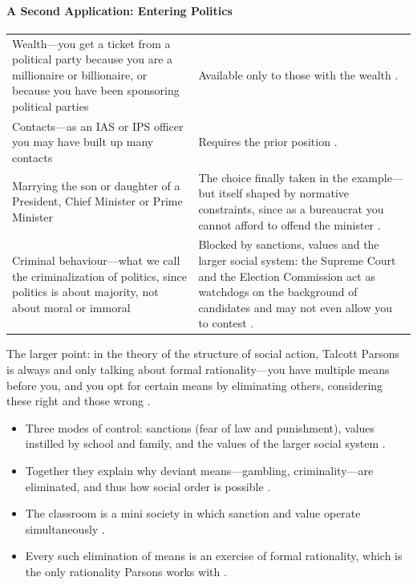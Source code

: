 \paragraph{A Second Application: Entering Politics}
\vspace{6pt}
\noindent
\begin{tabularx}{\textwidth}{>{\hsize}Y >{\hsize}Y}
\toprule
{}
 &  \\
\midrule
Wealth---you get a ticket from a political party because you are a millionaire or billionaire, or because you have been sponsoring political parties & Available only to those with the wealth . \\
\midrule
Contacts---as an IAS or IPS officer you may have built up many contacts & Requires the prior position . \\
\midrule
Marrying the son or daughter of a President, Chief Minister or Prime Minister & The choice finally taken in the example---but itself shaped by normative constraints, since as a bureaucrat you cannot afford to offend the minister . \\
\midrule
Criminal behaviour---what we call the criminalization of politics, since politics is about majority, not about moral or immoral & Blocked by sanctions, values and the larger social system: the Supreme Court and the Election Commission act as watchdogs on the background of candidates and may not even allow you to contest . \\
\bottomrule
\end{tabularx}
\vspace{6pt}

\begin{CriticalPoint}
The larger point: in the theory of the structure of social action, Talcott Parsons is always and only talking about formal rationality---you have multiple means before you, and you opt for certain means by eliminating others, considering these right and those wrong .
\end{CriticalPoint}

\begin{QuickRevision}
\begin{itemize}
    \item Three modes of control: sanctions (fear of law and punishment), values instilled by school and family, and the values of the larger social system .
    \item Together they explain why deviant means---gambling, criminality---are eliminated, and thus how social order is possible .
    \item The classroom is a mini society in which sanction and value operate simultaneously .
    \item Every such elimination of means is an exercise of formal rationality, which is the only rationality Parsons works with .
\end{itemize}
\end{QuickRevision}


